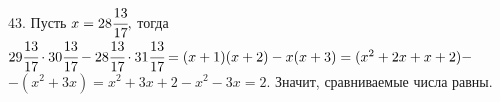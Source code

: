 43. Пусть $x=28\cfrac{13}{17},$ тогда $29\cfrac{13}{17}\cdot 30\cfrac{13}{17}-28\cfrac{13}{17}\cdot31\cfrac{13}{17}=
(x+1)(x+2)-x(x+3)=(x^2+2x+x+2)-$\\$-(x^2+3x)=x^2+3x+2-x^2-3x=2.$ Значит, сравниваемые числа равны.\\
